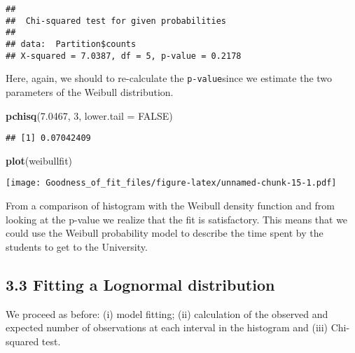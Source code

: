 \documentclass[
]{article}
\newenvironment{Shaded}{\begin{snugshade}}{\end{snugshade}}
\newcommand{\AttributeTok}[1]{\textcolor[rgb]{0.13,0.29,0.53}{#1}}
\newcommand{\ConstantTok}[1]{\textcolor[rgb]{0.56,0.35,0.01}{#1}}
\newcommand{\DecValTok}[1]{\textcolor[rgb]{0.00,0.00,0.81}{#1}}
\newcommand{\FloatTok}[1]{\textcolor[rgb]{0.00,0.00,0.81}{#1}}
\newcommand{\FunctionTok}[1]{\textcolor[rgb]{0.13,0.29,0.53}{\textbf{#1}}}
\newcommand{\NormalTok}[1]{#1}
\newcommand{\OtherTok}[1]{\textcolor[rgb]{0.56,0.35,0.01}{#1}}
\newcommand{\SpecialCharTok}[1]{\textcolor[rgb]{0.81,0.36,0.00}{\textbf{#1}}}
\newcommand{\StringTok}[1]{\textcolor[rgb]{0.31,0.60,0.02}{#1}}
\begin{document}
\begin{verbatim}
## 
##  Chi-squared test for given probabilities
## 
## data:  Partition$counts
## X-squared = 7.0387, df = 5, p-value = 0.2178
\end{verbatim}

Here, again, we should to re-calculate the \texttt{p-value}since we
estimate the two parameters of the Weibull distribution.

\begin{Shaded}
\begin{Highlighting}[]
\FunctionTok{pchisq}\NormalTok{(}\FloatTok{7.0467}\NormalTok{, }\DecValTok{3}\NormalTok{, }\AttributeTok{lower.tail =} \ConstantTok{FALSE}\NormalTok{)}
\end{Highlighting}
\end{Shaded}

\begin{verbatim}
## [1] 0.07042409
\end{verbatim}

\begin{Shaded}
\begin{Highlighting}[]
\FunctionTok{plot}\NormalTok{(weibullfit)}
\end{Highlighting}
\end{Shaded}

\texttt{[image: Goodness\_of\_fit\_files/figure-latex/unnamed-chunk-15-1.pdf]}

From a comparison of histogram with the Weibull density function and
from looking at the p-value we realize that the fit is satisfactory.
This means that we could use the Weibull probability model to describe
the time spent by the students to get to the University.

\hypertarget{fitting-a-lognormal-distribution}{%
\subsection{3.3 Fitting a Lognormal
distribution}\label{fitting-a-lognormal-distribution}}

We proceed as before: (i) model fitting; (ii) calculation of the
observed and expected number of observations at each interval in the
histogram and (iii) Chi-squared test.

\begin{Shaded}
\end{Shaded}
\end{document}
